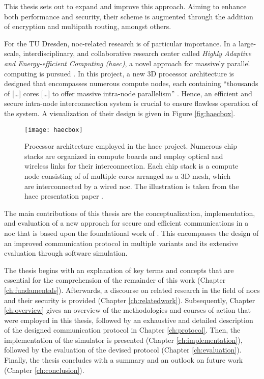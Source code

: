 This thesis sets out to expand and improve this approach. Aiming to enhance both performance and security, their scheme is augmented through the
addition of encryption and multipath routing, amongst others.

For the TU Dresden, \gls{noc}-related research is of particular importance. In a large-scale, interdisciplinary, and collaborative research center
called \textit{Highly Adaptive and Energy-efficient Computing (\gls{haec})}, a novel approach for massively parallel computing is pursued
\cite{matthiesen17haec}. In this project, a new 3D processor architecture is designed that encompasses numerous compute nodes, each containing
\enquote{thousands of […] cores […] to offer massive intra-node parallelism} \cite[1]{matthiesen17haec}. Hence, an efficient and secure intra-node
interconnection system is crucial to ensure flawless operation of the system. A visualization of their design is given in Figure \vref{fig:haecbox}.

\begin{figure}
    \centering
    \texttt{[image: haecbox]}
    \caption[Processor architecture in the HAEC project]{Processor architecture employed in the \gls{haec} project. Numerous chip stacks are organized
    in compute boards and employ optical and wireless links for their interconnection. Each chip stack is a compute node consisting of of multiple
    cores arranged as a 3D mesh, which are interconnected by a wired \gls{noc}. The illustration is taken from the \gls{haec} presentation paper
    \cite[1]{matthiesen17haec}.}
    \label{fig:haecbox}
\end{figure}

The main contributions of this thesis are the conceptualization, implementation, and evaluation of a new approach for secure and efficient
communications in a \gls{noc} that is based upon the foundational work of \citeauthor{moriam18activeattackers}
\cites{moriam15manycorenc}{moriam18activeattackers}. This encompasses the design of an improved communication protocol in multiple variants and its
extensive evaluation through software simulation.

The thesis begins with an explanation of key terms and concepts that are essential for the comprehension of the remainder of this work (Chapter
\ref{ch:fundamentals}). Afterwards, a discourse on related research in the field of \glspl{noc} and their security is provided (Chapter
\ref{ch:relatedwork}). Subsequently, Chapter \ref{ch:overview} gives an overview of the methodologies and courses of action that were employed in this
thesis, followed by an exhaustive and detailed description of the designed communication protocol in Chapter \ref{ch:protocol}. Then, the
implementation of the simulator is presented (Chapter \ref{ch:implementation}), followed by the evaluation of the devised protocol (Chapter
\ref{ch:evaluation}). Finally, the thesis concludes with a summary and an outlook on future work (Chapter \ref{ch:conclusion}).

